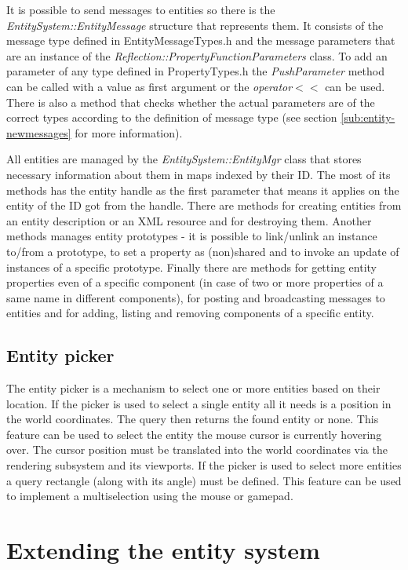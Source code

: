 It is possible to send messages to entities so there is the \emph{EntitySystem::EntityMessage} structure that represents them. It consists of the message type defined in EntityMessageTypes.h and the message parameters that are an instance of the \emph{Reflection::PropertyFunctionParameters} class. To add an parameter of any type defined in PropertyTypes.h the \emph{PushParameter} method can be called with a value as first argument or the \emph{operator}$<<$ can be used. There is also a method that checks whether the actual parameters are of the correct types according to the definition of message type (see section \ref{sub:entity-newmessages} for more information).

All entities are managed by the \emph{EntitySystem::EntityMgr} class that stores necessary information about them in maps indexed by their ID. The most of its methods has the entity handle as the first parameter that means it applies on the entity of the ID got from the handle. There are methods for creating entities from an entity description or an XML resource and for destroying them. Another methods manages entity prototypes - it is possible to link/unlink an instance to/from a prototype, to set a property as (non)shared and to invoke an update of instances of a specific prototype. Finally there are methods for getting entity properties even of a specific component (in case of two or more properties of a same name in different components), for posting and broadcasting messages to entities and for adding, listing and removing components of a specific entity.

\subsection{Entity picker}

The entity picker is a mechanism to select one or more entities based on their location. If the picker is used to select a single entity all it needs is a position in the world coordinates. The query then returns the found entity or none. This feature can be used to select the entity the mouse cursor is currently hovering over. The cursor position must be translated into the world coordinates via the rendering subsystem and its viewports. If the picker is used to select more entities a query rectangle (along with its angle) must be defined. This feature can be used to implement a multiselection using the mouse or gamepad.


\section{Extending the entity system}
\label{sec:entity-extending}

